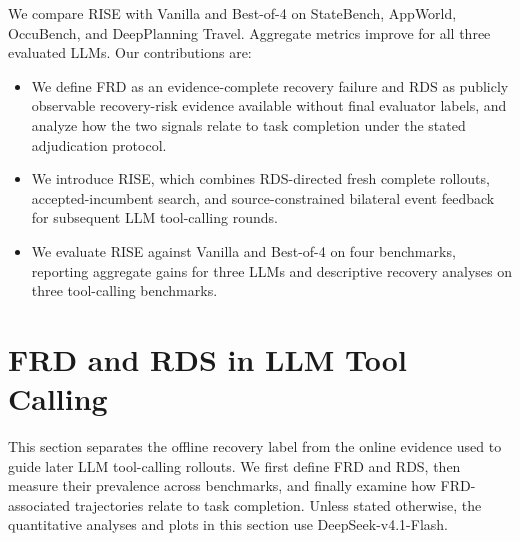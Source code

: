 \documentclass{article}
\begin{document}
We compare RISE with Vanilla and Best-of-4 on StateBench, AppWorld, OccuBench, and DeepPlanning Travel. Aggregate metrics improve for all three evaluated LLMs. Our contributions are:
\begin{itemize}
    \item We define FRD as an evidence-complete recovery failure and RDS as publicly observable recovery-risk evidence available without final evaluator labels, and analyze how the two signals relate to task completion under the stated adjudication protocol.
    \item We introduce RISE, which combines RDS-directed fresh complete rollouts, accepted-incumbent search, and source-constrained bilateral event feedback for subsequent LLM tool-calling rounds.
    \item We evaluate RISE against Vanilla and Best-of-4 on four benchmarks, reporting aggregate gains for three LLMs and descriptive recovery analyses on three tool-calling benchmarks.
\end{itemize}

\section{FRD and RDS in LLM Tool Calling}
This section separates the offline recovery label from the online evidence used to guide later LLM tool-calling rollouts. We first define FRD and RDS, then measure their prevalence across benchmarks, and finally examine how FRD-associated trajectories relate to task completion. Unless stated otherwise, the quantitative analyses and plots in this section use DeepSeek-v4.1-Flash.
\end{document}
